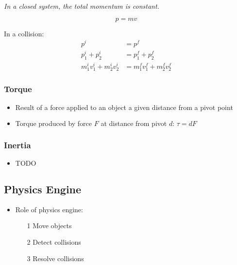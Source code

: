 \documentclass[a4paper]{article}
\begin{document}
\textit{In a closed system, the total momentum is constant.}

\[
  p = mv
\]

In a collision:
\begin{align*}
  p^{i} &= p^{f} \\
  p^{i}_{1} + p^{i}_{2} &= p^{f}_{1} + p^{f}_{2} \\
  m^{i}_{1} v^{i}_{1} + m^{i}_{2} v^{i}_{2} &= m^{f}_{1} v^{f}_{1} + m^{f}_{2} v^{f}_{2}
\end{align*}

\subsubsection{Torque}

\begin{itemize}
  \item
    Result of a force applied to an object a given distance from a pivot point

  \item
    Torque produced by force $F$ at distance from pivot $d$: $\tau = dF$

\end{itemize}

\subsubsection{Inertia}

\begin{itemize}
  \item
    TODO

\end{itemize}

\subsection{Physics Engine}

\begin{itemize}
  \item
    Role of physics engine:

    \begin{enumerate}
      \item[1]
        Move objects

      \item[2]
        Detect collisions

      \item[3]
        Resolve collisions

    \end{enumerate}

\end{itemize}
\end{document}
